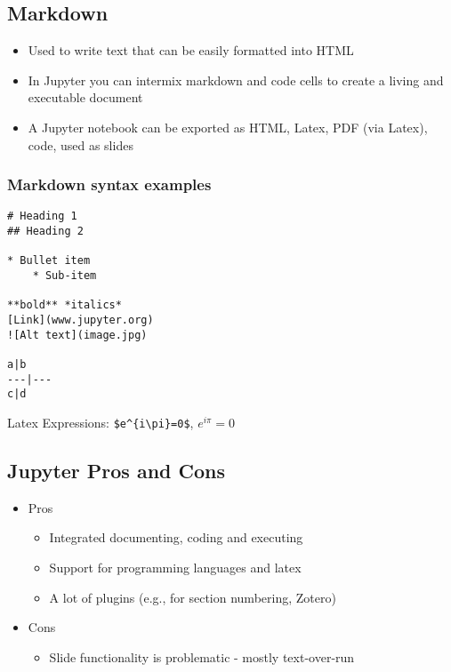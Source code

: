 \documentclass[11pt]{article}
\providecommand{\tightlist}{%
      \setlength{\itemsep}{0pt}\setlength{\parskip}{0pt}}
\begin{document}
    \subsection{Markdown}\label{markdown}

\begin{itemize}
\tightlist
\item
  Used to write text that can be easily formatted into HTML
\item
  In Jupyter you can intermix markdown and code cells to create a living
  and executable document
\item
  A Jupyter notebook can be exported as HTML, Latex, PDF (via Latex),
  code, used as slides
\end{itemize}

    \subsubsection{Markdown syntax examples}\label{markdown-syntax-examples}

\begin{verbatim}
# Heading 1
## Heading 2

* Bullet item
    * Sub-item

**bold** *italics*
[Link](www.jupyter.org)
![Alt text](image.jpg)

a|b
---|---
c|d
\end{verbatim}

Latex Expressions: \texttt{\$e\^{}\{i\textbackslash{}pi\}=0\$},
\(e^{i\pi}=0\)

    \subsection{Jupyter Pros and Cons}\label{jupyter-pros-and-cons}

\begin{itemize}
\tightlist
\item
  Pros

  \begin{itemize}
  \tightlist
  \item
    Integrated documenting, coding and executing
  \item
    Support for programming languages and latex
  \item
    A lot of plugins (e.g., for section numbering, Zotero)
  \end{itemize}
\item
  Cons

  \begin{itemize}
  \tightlist
  \item
    Slide functionality is problematic - mostly text-over-run
  \end{itemize}
\end{itemize}
\end{document}
